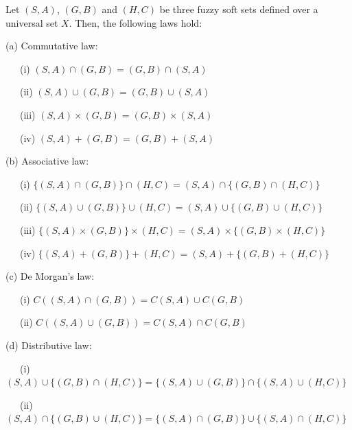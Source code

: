 \documentclass[10pt,a4paper]{amsart}
\begin{document}
\begin{theorem}
    Let $(S,A)$, $(G,B)$ and $(H,C)$ be three fuzzy soft sets defined over a universal set $X$. Then, the following laws hold:

(a) Commutative law:

    ~~~(i) $(S,A) \cap (G,B) = (G,B) \cap (S,A)$

    ~~~(ii) $(S,A) \cup (G,B) = (G,B) \cup (S,A)$

    ~~~(iii) $(S,A) \times (G,B) = (G,B) \times (S,A)$

    ~~~(iv) $(S,A) + (G,B) = (G,B) + (S,A)$

    (b) Associative law:

    ~~~(i) $\{(S,A) \cap (G,B)\}\cap (H,C) = (S,A) \cap \{(G,B)\cap (H,C)\}$

    ~~~(ii) $\{(S,A) \cup (G,B)\}\cup (H,C) = (S,A) \cup \{(G,B)\cup (H,C)\}$

    ~~~(iii) $\{(S,A) \times (G,B)\} \times (H,C) = (S,A) \times \{(G,B) \times (H,C)\}$

    ~~~(iv) $\{(S,A) + (G,B)\} + (H,C) = (S,A) + \{(G,B) + (H,C)\}$

    (c) De Morgan's law:

    ~~~(i) $C((S,A) \cap (G,B)) = C(S,A) \cup C(G,B)$

    ~~~(ii) $C((S,A) \cup (G,B)) = C(S,A) \cap C(G,B)$

    (d) Distributive law:

    ~~~(i) $(S,A)\cup \{(G,B) \cap (H,C)\} = \{(S,A) \cup (G, B)\} \cap \{(S,A) \cup (H,C)\}$

    ~~~(ii) $(S,A)\cap \{(G,B) \cup (H,C)\} = \{(S,A) \cap (G,B)\} \cup \{(S,A) \cap (H,C)\}$

\end{theorem}
\end{document}
